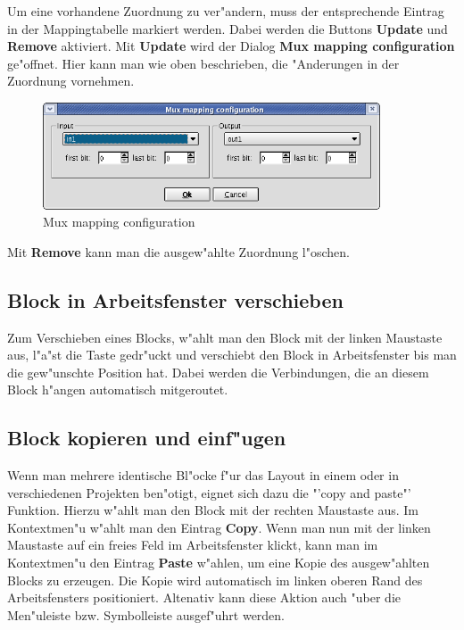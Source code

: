\documentclass[a4paper,titlepage,12pt,ngerman]{scrbook}
\begin{document}
Um eine vorhandene Zuordnung zu ver"andern, muss der entsprechende Eintrag in der Mappingtabelle markiert werden. Dabei werden die Buttons {\bf Update} und {\bf Remove} aktiviert.\newline
Mit {\bf Update} wird der Dialog {\bf Mux mapping configuration} ge"offnet. Hier kann man wie oben beschrieben, die "Anderungen in der Zuordnung vornehmen.\newline

\begin{figure}[htbp]

\begin{center}

\includegraphics[width=10cm]{Muxzuordnung}

\caption{Mux mapping configuration}\label{test}

\end{center}

\end{figure}

Mit {\bf Remove} kann man die ausgew"ahlte Zuordnung l"oschen.\par


\subsection{Block in Arbeitsfenster verschieben}
Zum Verschieben eines Blocks, w"ahlt man den Block mit der linken Maustaste aus, l"a"st die Taste gedr"uckt und verschiebt den Block in Arbeitsfenster bis man die gew"unschte Position hat. Dabei werden die Verbindungen, die an diesem Block h"angen automatisch mitgeroutet.


\subsection{Block kopieren und einf"ugen}
Wenn man mehrere identische Bl"ocke f"ur das Layout in einem oder in verschiedenen Projekten ben"otigt, eignet sich dazu die "'copy and paste"' Funktion. Hierzu w"ahlt man den Block mit der rechten Maustaste aus. Im Kontextmen"u w"ahlt man den Eintrag {\bf Copy}. Wenn man nun mit der linken Maustaste auf ein freies Feld im Arbeitsfenster klickt, kann man im Kontextmen"u den Eintrag {\bf Paste} w"ahlen, um eine Kopie des ausgew"ahlten Blocks zu erzeugen.
Die Kopie wird automatisch im linken oberen Rand des Arbeitsfensters positioniert.\newline
Altenativ kann diese Aktion auch "uber die Men"uleiste bzw. Symbolleiste ausgef"uhrt werden.
\end{document}

